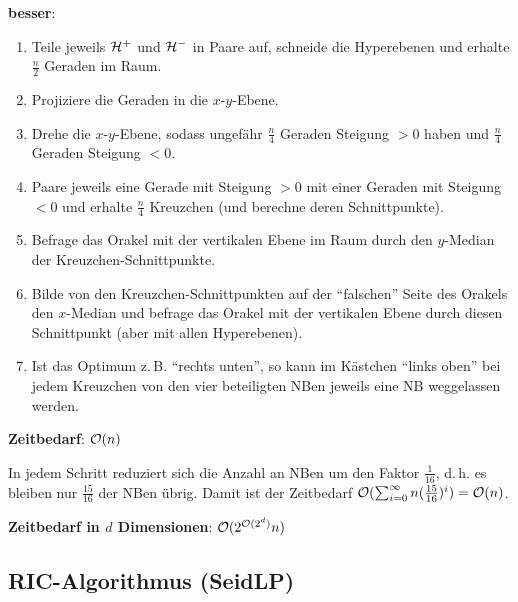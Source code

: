 \textbf{besser}:
\begin{enumerate}
    \item
    Teile jeweils $\mathcal{H}^+$ und $\mathcal{H}^-$ in Paare auf, schneide die Hyperebenen und erhalte
    $\frac{n}{2}$ Geraden im Raum.

    \item
    Projiziere die Geraden in die $x$-$y$-Ebene.

    \item
    Drehe die $x$-$y$-Ebene, sodass ungefähr $\frac{n}{4}$ Geraden Steigung $> 0$ haben und
    $\frac{n}{4}$ Geraden Steigung $< 0$.

    \item
    Paare jeweils eine Gerade mit Steigung $> 0$ mit einer Geraden mit Steigung $< 0$
    und erhalte $\frac{n}{4}$ Kreuzchen
    (und berechne deren Schnittpunkte).

    \item
    Befrage das Orakel mit der vertikalen Ebene im Raum durch den $y$-Median der
    Kreuzchen-Schnittpunkte.

    \item
    Bilde von den Kreuzchen-Schnittpunkten auf der "`falschen"' Seite des Orakels den $x$-Median
    und befrage das Orakel mit der vertikalen Ebene durch diesen Schnittpunkt
    (aber mit allen Hyperebenen).

    \item
    Ist das Optimum z.\,B. "`rechts unten"', so kann im Kästchen "`links oben"' bei jedem
    Kreuzchen von den vier beteiligten NBen jeweils eine NB weggelassen werden.
\end{enumerate}

\textbf{Zeitbedarf}:
$\mathcal{O}(n)$

\begin{Beweis}
    In jedem Schritt reduziert sich die Anzahl an NBen um den Faktor $\frac{1}{16}$,
    d.\,h. es bleiben nur $\frac{15}{16}$ der NBen übrig.
    Damit ist der Zeitbedarf $\mathcal{O}(\sum_{i=0}^\infty n(\frac{15}{16})^i) = \mathcal{O}(n)$.
\end{Beweis}

\textbf{Zeitbedarf in $d$ Dimensionen}:
$\mathcal{O}(2^{\mathcal{O}(2^d)} n)$

\pagebreak

\subsection{%
    RIC-Algorithmus (SeidLP)%
}

